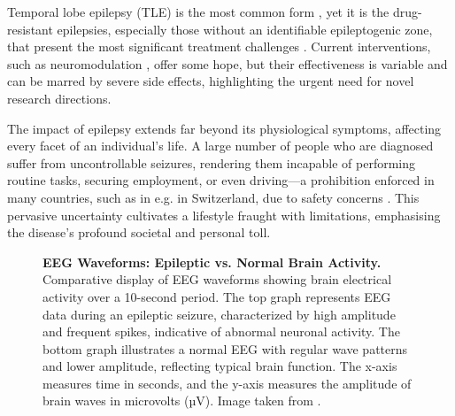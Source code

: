 \documentclass[10pt]{article}
\begin{document}
\begin{sloppypar}
  Temporal lobe epilepsy (TLE) is the most common form \citep{epilepsy_foundation_temporal_2019},  yet it is the drug-resistant epilepsies, especially those without an identifiable epileptogenic zone, that present the most significant treatment challenges \citep{iwasaki_non-invasive_2016, guery_clinical_2021}. Current interventions, such as neuromodulation \citep{fisher_electrical_2014}, offer some hope, but their effectiveness is variable and can be marred by severe side effects, highlighting the urgent need for novel research directions.

  The impact of epilepsy extends far beyond its physiological symptoms, affecting every facet of an individual's life. A large number of people who are diagnosed suffer from uncontrollable seizures, rendering them incapable of performing routine tasks, securing employment, or even driving—a prohibition enforced in many countries, such as in e.g. in Switzerland, due to safety concerns \citep{schweizerische_epilepsieliga_driving_2021}. This pervasive uncertainty cultivates a lifestyle fraught with limitations, emphasising the disease's profound societal and personal toll.

  \begin{figure}[ht]
    \centering
    \caption[EEG Waveforms: Epileptic vs. Normal Brain Activity]{\textbf{EEG Waveforms: Epileptic vs. Normal Brain Activity.} Comparative display of EEG waveforms showing brain electrical activity over a 10-second period. The top graph represents EEG data during an epileptic seizure, characterized by high amplitude and frequent spikes, indicative of abnormal neuronal activity. The bottom graph illustrates a normal EEG with regular wave patterns and lower amplitude, reflecting typical brain function. The x-axis measures time in seconds, and the y-axis measures the amplitude of brain waves in microvolts (µV). Image taken from \cite{espinosa_feedforward_2020}.}
    \label{fig:seizure-eeg}
  \end{figure}


\end{sloppypar}
\end{document}
